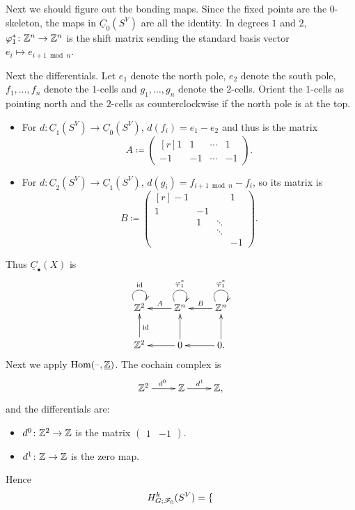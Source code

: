 \begin{exm}
Next we should figure out the bonding maps. Since the fixed points are the $0$-skeleton, the maps in $\underline
C_0(S^V)$ are all the identity. In degrees $1$ and $2$, $\varphi_1^*\colon\mathbb Z^n\to\mathbb Z^n$ is the shift matrix sending the
standard basis vector $e_i\mapsto e_{i+1\bmod n}$.

Next the differentials. Let $e_1$ denote the north pole, $e_2$ denote the south pole, $f_1,\dotsc,f_n$ denote the
$1$-cells and $g_1,\dotsc,g_n$ denote the $2$-cells. Orient the $1$-cells as pointing north and the $2$-cells as
counterclockwise if the north pole is at the top.
\begin{itemize}
	\item For $d\colon \underline C_1(S^V)\to\underline C_0(S^V)$, $d(f_i) = e_1 - e_2$ and thus is the matrix
	\[A\coloneqq \begin{pmatrix*}[r] 1 & 1 & \dotsb & 1\\
	-1 & -1 & \dotsb & -1\end{pmatrix*}.\]
	\item For $d\colon \underline C_2(S^V)\to\underline C_1(S^V)$, $d(g_i) = f_{i+1\bmod n} - f_i$, so its matrix
	is
	\[B\coloneqq \begin{pmatrix*}[r]
		-1 &&& 1\\
		1 & -1\\
		& 1 & \ddots\\
		&& \ddots\\
		&&& -1
		\end{pmatrix*}.\]
\end{itemize}
Thus $\underline C_\bullet(X)$ is
\begin{equation}
\label{C_*Cn}
\gathxy{
	\Z^2\ar@(ul,ur)^\id & \Z^n\ar[l]_A\ar@(ul,ur)^{\vp_1^*} & \Z^n\ar[l]_B\ar@(ul,ur)^{\vp_1^*}\\
	\Z^2\ar[u]_\id & 0\ar[l]\ar[u] & 0.\ar[l]\ar[u]
}
\end{equation}
Next we apply $\operatorname{Hom}(\text{--},\underline{\mathbb Z})$. The cochain complex is
\[\xymatrix{
	\Z^2\ar[r]^{d^0} & \Z\ar[r]^{d^1} & \Z,
}\]
and the differentials are:
\begin{itemize}
	\item $d^0\colon\mathbb Z^2\to\mathbb Z$ is the matrix $\begin{pmatrix}1 & -1\end{pmatrix}$.
	\item $d^1\colon\mathbb Z\to\mathbb Z$ is the zero map.
\end{itemize}
Hence
\begin{equation}
\label{Cncoh}
H_{G;\mathscr F_0}^k(S^V) = \begin{cases}

\end{cases}
\end{equation}
\end{exm}
